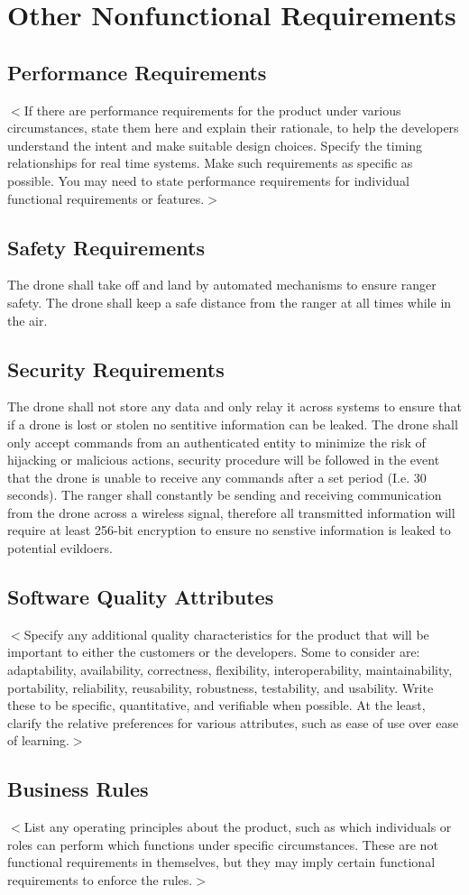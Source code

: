 \chapter{Other Nonfunctional Requirements}

\section{Performance Requirements}
$<$If there are performance requirements for the product under various
circumstances, state them here and explain their rationale, to help the
developers understand the intent and make suitable design choices. Specify the
timing relationships for real time systems. Make such requirements as specific
as possible. You may need to state performance requirements for individual
functional requirements or features.$>$

\section{Safety Requirements}
The drone shall take off and land by automated mechanisms to ensure ranger safety.
The drone shall keep a safe distance from the ranger at all times while in the air.

\section{Security Requirements}
The drone shall not store any data and only relay it across systems to ensure that if a drone is lost or stolen no sentitive information can be leaked.
The drone shall only accept commands from an authenticated entity to minimize the risk of hijacking or malicious actions, 
security procedure will be followed in the event that the drone is unable to receive any commands after a set period (I.e. 30 seconds).
The ranger shall constantly be sending and receiving communication from the drone across a wireless signal, 
therefore all transmitted information will require at least 256-bit encryption to ensure no senstive information is leaked to potential evildoers.

\section{Software Quality Attributes}
$<$Specify any additional quality characteristics for the product that will be
important to either the customers or the developers. Some to consider are:
adaptability, availability, correctness, flexibility, interoperability,
maintainability, portability, reliability, reusability, robustness, testability,
and usability. Write these to be specific, quantitative, and verifiable when
possible. At the least, clarify the relative preferences for various attributes,
such as ease of use over ease of learning.$>$

\section{Business Rules}
$<$List any operating principles about the product, such as which individuals or
roles can perform which functions under specific circumstances. These are not
functional requirements in themselves, but they may imply certain functional
requirements to enforce the rules.$>$
